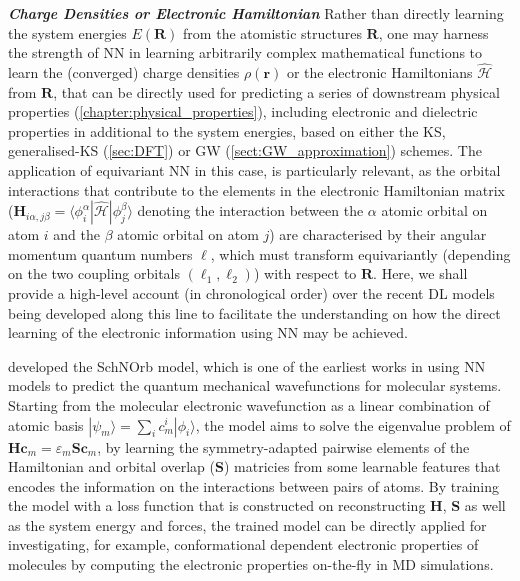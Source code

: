 \textbf{\emph{Charge Densities or Electronic Hamiltonian}} Rather than directly learning the system energies $E(\bm{R})$ from the atomistic structures $\bm{R}$, one may harness the  strength of NN in learning arbitrarily complex mathematical functions to learn the (converged) charge densities $\rho(\bm{r})$ or the electronic Hamiltonians $\hat{\mathcal{H}}$ from $\bm{R}$, that can be directly used for predicting a series of downstream physical properties (\cref{chapter:physical_properties}), including electronic and dielectric properties in additional to the system energies, based on either the KS, generalised-KS (\cref{sec:DFT}) or GW (\cref{sect:GW_approximation}) schemes. The application of equivariant NN in this case, is particularly relevant, as the orbital interactions that contribute to the elements in the  electronic Hamiltonian matrix ($\bm{H}_{i\alpha,j\beta}=\langle\phi_i^\alpha|\hat{\mathcal{H}}|\phi_j^\beta\rangle$ denoting the interaction between the $\alpha$ atomic orbital on atom $i$ and the $\beta$ atomic orbital on atom $j$) are characterised by their angular momentum quantum numbers $\ell$, which must transform equivariantly (depending on the two coupling orbitals $(\ell_1,\ell_2)$) with respect to $\bm{R}$. Here, we shall provide a high-level account (in chronological order) over the recent DL models being developed along this line to facilitate the understanding on how the direct learning of the electronic information using NN may be achieved.

\citet{Schutt2019-mu} developed the SchNOrb model, which is one of the earliest works in using NN models to predict the quantum mechanical wavefunctions for molecular systems. Starting from the molecular electronic wavefunction as a linear combination of atomic basis $|\psi_m\rangle=\sum_i c_m^i|\phi_i\rangle$, the model aims to solve the eigenvalue problem of $\bm{H}\bm{c}_{m}=\varepsilon_m\bm{S}\bm{c}_{m}$, by learning the symmetry-adapted pairwise elements of the Hamiltonian and orbital overlap ($\bm{S}$) matricies from some  learnable features that encodes the information on the interactions between pairs of atoms. By training the model with a loss function that is constructed on reconstructing $\bm{H}$, $\bm{S}$ as well as the system energy and forces, the trained model can be directly applied for investigating, for example, conformational dependent electronic properties of molecules by computing the electronic properties on-the-fly in MD simulations. 

